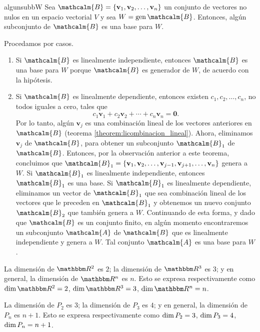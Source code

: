 \begin{theorem}{}{algunsubbW}
    Sea $\mathcalm{B} = \{\mathbf{v}_1, \mathbf{v}_2, \dots, \mathbf{v}_n\}$ un conjunto de vectores no nulos en un espacio vectorial $V$ y sea $W = \Gen \mathcalm{B}$. Entonces, algún subconjunto de $\mathcalm{B}$ es una base para $W$.

    \tcblower
    \demostracion Procedamos por casos.
    \begin{enumerate}[label=\roman*), topsep=6pt, itemsep=0pt]
        \item Si $\mathcalm{B}$ es linealmente independiente, entonces $\mathcalm{B}$ es una base para $W$ porque $\mathcalm{B}$ es generador de $W$, de acuerdo con la hipótesis.
        \item Si $\mathcalm{B}$ es linealmente dependiente, entonces existen $c_1, c_2, \dots, c_n$, no todos iguales a cero, tales que
        $$c_1 \mathbf{v}_1 + c_2 \mathbf{v}_2 + \cdots + c_n \mathbf{v}_n = \mathbf{0}.$$
        Por lo tanto, algún $\mathbf{v}_j$ es una combinación lineal de los vectores anteriores en $\mathcalm{B}$ (teorema \ref{theorem:licombinacion_lineal}). Ahora, eliminamos $\mathbf{v}_j$ de $\mathcalm{B}$, para obtener un subconjunto $\mathcalm{B}_1$ de $\mathcalm{B}$. Entonces, por la observación anterior a este teorema, concluimos que $\mathcalm{B}_1 = \{\mathbf{v}_1, \mathbf{v}_2, \dots, \mathbf{v}_{j-1}, \mathbf{v}_{j+1}, \dots, \mathbf{v}_n\}$ genera a $W$. Si $\mathcalm{B}_1$ es linealmente independiente, entonces $\mathcalm{B}_1$ es una base. Si $\mathcalm{B}_1$ es linealmente dependiente, eliminamos un vector de $\mathcalm{B}_1$ que sea combinación lineal de los vectores que le preceden en $\mathcalm{B}_1$ y obtenemos un nuevo conjunto $\mathcalm{B}_2$ que también genera a $W$. Continuando de esta forma, y dado que $\mathcalm{B}$ es un conjunto finito, en algún momento encontraremos un subconjunto $\mathcalm{A}$ de $\mathcalm{B}$ que es linealmente independiente y genera a $W$. Tal conjunto $\mathcalm{A}$ es una base para $W$.
    \end{enumerate}
\end{theorem}

\begin{examplebox}{}{}
    La dimensión de $\RR[2]$ es $2$; la dimensión de $\RR[3]$ es $3$; y en general, la dimensión de $\RR[n]$ es $n$. Esto se expresa respectivamente como $\Dim \RR[2] = 2$, $\Dim \RR[3] = 3$, $\Dim \RR[n] = n$.
\end{examplebox}

\begin{examplebox}{}{}
    La dimensión de $P_2$ es $3$; la dimensión de $P_3$ es $4$; y en general, la dimensión de $P_n$ es $n + 1$. Esto se expresa respectivamente como $\operatorname{dim} P_2 = 3$, $\operatorname{dim} P_3 = 4$, $\operatorname{dim} P_n = n + 1$.
\end{examplebox}

